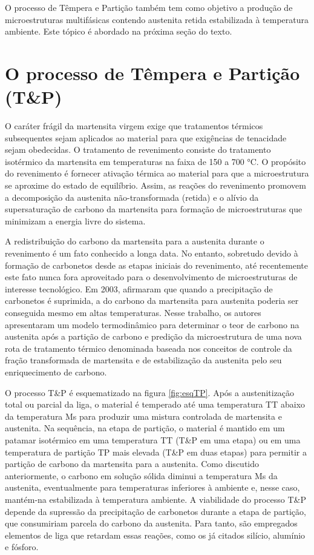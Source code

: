 O processo de Têmpera e Partição também tem como objetivo a produção de microestruturas multifásicas contendo austenita retida estabilizada à temperatura ambiente. Este tópico é abordado na próxima seção do texto.

\section{O processo de T\^{e}mpera e Parti\c{c}\~{a}o (T\&P)}

\label{sec:processoTP}
 
O caráter frágil da martensita virgem exige que tratamentos térmicos subsequentes sejam aplicados ao material para que exigências de tenacidade sejam obedecidas. O tratamento de revenimento consiste do tratamento isotérmico da martensita em temperaturas na faixa de 150 a 700 °C. O propósito do revenimento é fornecer ativação térmica ao material para que a microestrutura se aproxime do estado de equilíbrio\cite{Honeycombe2006}. Assim, as reações do revenimento promovem a decomposição da austenita não-transformada (retida) e o alívio da supersaturação de carbono da martensita para formação de microestruturas que minimizam a energia livre do sistema.

A redistribuição do carbono da martensita para a austenita durante o revenimento é um fato conhecido a longa data\cite{Matas1960}. No entanto, sobretudo devido à formação de carbonetos desde as etapas iniciais do revenimento, até recentemente este fato nunca fora aproveitado para o desenvolvimento de microestruturas de interesse tecnológico. Em 2003,  afirmaram que quando a precipitação de carbonetos é suprimida, a  do carbono da martensita para austenita poderia ser conseguida mesmo em altas temperaturas. Nesse trabalho, os autores apresentaram um modelo termodinâmico para determinar o teor de carbono na austenita após a partição de carbono e predição da microestrutura de uma nova rota de tratamento térmico denominada  baseada nos conceitos de controle da fração transformada de martensita e de estabilização da austenita pelo seu enriquecimento de carbono.

O processo T\&P é esquematizado na figura \ref{fig:esqTP}. Após a austenitização total ou parcial da liga, o material é temperado até uma temperatura TT abaixo da temperatura Ms para produzir uma mistura controlada de martensita e austenita. Na sequência, na etapa de partição, o material é mantido em um patamar isotérmico em uma temperatura TT (T\&P em uma etapa) ou em uma temperatura de partição TP mais elevada (T\&P em duas etapas) para permitir a partição de carbono da martensita para a austenita. Como discutido anteriormente, o carbono em solução sólida diminui a temperatura Ms da austenita, eventualmente para temperaturas inferiores à ambiente e, nesse caso, mantém-na estabilizada à temperatura ambiente. A viabilidade do processo T\&P depende da supressão da precipitação de carbonetos durante a etapa de partição, que consumiriam parcela do carbono da austenita. Para tanto, são empregados elementos de liga que retardam essas reações, como os já citados silício, alumínio e fósforo.

